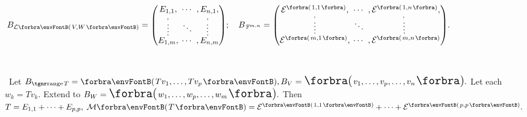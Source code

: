 $\hText{B_{\Lm[\SmallPar]{V,W}}={}${\normalsize${\begin{pmatrix} \underset{\;,}{E_{1,1}}, &\hspace{-6pt} \cdots &\hspace{-6pt} ,\underset{\!,}{E_{n,1}},\\[-2pt] \vdots &\hspace{-6pt} \ddots &\hspace{-6pt} \vdots\\[-2pt] \overset{\;,}{E_{1,m}}, &\hspace{-6pt} \cdots &\hspace{-6pt} ,\overset{\!\!\!,}{E_{n,m}}\end{pmatrix}}$}$;\quad B_{\,\Fbb^{m,n}}={}${\normalsize$\envFontSmall[\scriptsize]{\begin{pmatrix} \underset{\;,}{\mE^{\Par{1,1}}}, &\hspace{-6pt} \cdots &\hspace{-6pt} ,\underset{\!\!,}{\mE^{\Par{1,n}}},\\[-2pt] \vdots &\hspace{-6pt} \ddots &\hspace{-6pt} \vdots\\[-2pt]\overset{\;,}{\mE^{\Par{m,1}}}, &\hspace{-6pt} \cdots &\hspace{-6pt} ,\overset{\!\!\!,}{\mE^{\Par{m,n}}}\end{pmatrix}}$}.$\\[2pt]\,\\\,}$\par\vspace{-30pt}
\BulletPointX\Tips \,\,\,Let $B_{\range T}=\Par{Tv_1,\dots,Tv_p},B_V=\BigPar{v_1,\dots,v_p,\dots,v_n}.$ Let each $w_k=Tv_k.$\TextB{\vspace{2pt}}\IndentTips{}
Extend to $B_W=\BigPar{w_1,\dots,w_p,\dots,w_m}.$ Then $T=E_{1,1}+\dots+E_{p,p},\;\Mt{T}=\mEnt{1,1}+\dots+\mEnt{p,p}.$\vspace{-4pt}
\SepLine

